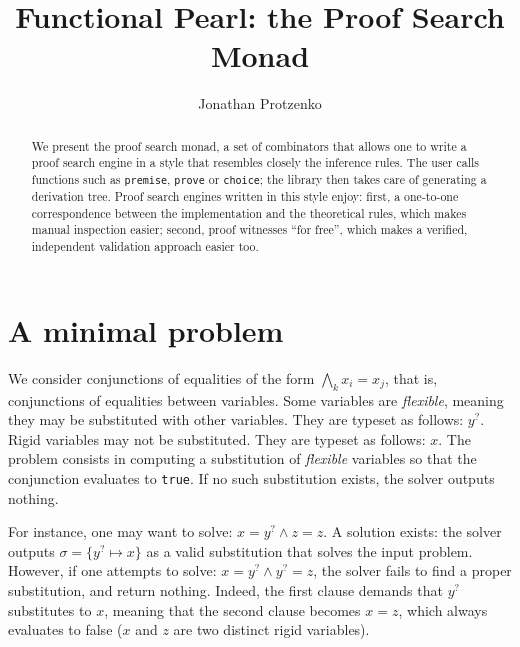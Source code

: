 \documentclass{easychair}
\def\li{\lstinline}
\newcommand{\f}[1]{\ensuremath{#1^?}} %
\begin{document}
\title{Functional Pearl: the Proof Search Monad}

\author{Jonathan Protzenko}

\maketitle

\begin{abstract}
  We present the proof search monad, a set of combinators that allows one to
  write a proof search engine in a style that resembles closely the inference
  rules. The user calls functions such as \li+premise+, \li+prove+ or
  \li+choice+; the library then takes care of generating a derivation tree.
  Proof search engines written in this style enjoy: first, a one-to-one
  correspondence between the implementation and the theoretical rules, which
  makes manual inspection easier; second, proof witnesses ``for free'', which
  makes a verified, independent validation approach easier too.
\end{abstract}

\section{A minimal problem}

We consider conjunctions of equalities of the form
$\bigwedge_k x_i = x_j$, that is, conjunctions of
equalities between variables. Some variables are \emph{flexible}, meaning they may be
substituted with other variables. They are typeset as follows: $\f y$.
Rigid variables may not be substituted. They are typeset as follows: $x$. The
problem consists in computing a substitution of \emph{flexible} variables so that
the conjunction evaluates to \li+true+. If no such substitution exists, the
solver outputs nothing.

For instance, one may want to solve: $x = \f y \wedge z = z$.
A solution exists: the solver outputs $\sigma = \{ \f y \mapsto x \}$ as a valid
substitution that solves the input problem. However, if one attempts to solve:
$x = \f y \wedge \f y = z$, the solver fails to find a
proper substitution, and return nothing. Indeed, the first clause demands that
$\f y$ substitutes to $x$, meaning that the second clause becomes $x = z$, which
always evaluates to false ($x$ and $z$ are two distinct rigid variables).
\end{document}
